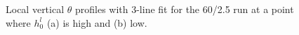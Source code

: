 \begin{figure}[htbp]
\begin{minipage}[b]{0.5\linewidth}
        \\
        \end{minipage}             
\quad
\begin{minipage}[b]{0.5\linewidth}
        \\       
       \end{minipage}
\caption[High local ML ]{Local vertical $\theta$ profiles with 3-line fit for the 60/2.5 run at a point where $h^{l}_{0}$ (a) is high and (b) low.}
\label{fig:rssfitshigh}
\end{figure}

